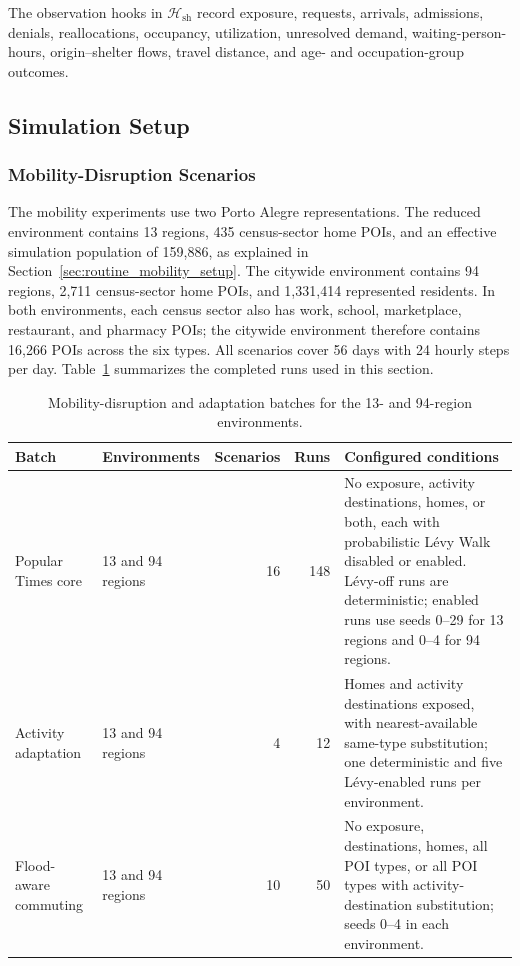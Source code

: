 The observation hooks in $\mathcal{H}_{\mathrm{sh}}$ record exposure, requests, arrivals, admissions, denials, reallocations, occupancy, utilization, unresolved demand, waiting-person-hours, origin--shelter flows, travel distance, and age- and occupation-group outcomes.

\subsection{Simulation Setup}
\label{sec:environment_disruption_setup}

\subsubsection{Mobility-Disruption Scenarios}

The mobility experiments use two Porto Alegre representations. The reduced environment contains 13 regions, 435 census-sector home POIs, and an effective simulation population of 159,886, as explained in Section~\ref{sec:routine_mobility_setup}. The citywide environment contains 94 regions, 2,711 census-sector home POIs, and 1,331,414 represented residents. In both environments, each census sector also has work, school, marketplace, restaurant, and pharmacy POIs; the citywide environment therefore contains 16,266 POIs across the six types. All scenarios cover 56 days with 24 hourly steps per day. Table~\ref{tbl:mobility_disruption_batches} summarizes the completed runs used in this section.

\begin{table}[ht]
\centering
\footnotesize
\caption{Mobility-disruption and adaptation batches for the 13- and 94-region environments.}
\label{tbl:mobility_disruption_batches}
\begin{tabularx}{\linewidth}{@{}llrrX@{}}
\toprule
\textbf{Batch} & \textbf{Environments} & \textbf{Scenarios} & \textbf{Runs} & \textbf{Configured conditions} \\
\midrule
Popular Times core
    & 13 and 94 regions & 16 & 148
    & No exposure, activity destinations, homes, or both, each with probabilistic L\'evy Walk disabled or enabled. L\'evy-off runs are deterministic; enabled runs use seeds 0--29 for 13 regions and 0--4 for 94 regions. \\
Activity adaptation
    & 13 and 94 regions & 4 & 12
    & Homes and activity destinations exposed, with nearest-available same-type substitution; one deterministic and five L\'evy-enabled runs per environment. \\
Flood-aware commuting
    & 13 and 94 regions & 10 & 50
    & No exposure, destinations, homes, all POI types, or all POI types with activity-destination substitution; seeds 0--4 in each environment. \\
\bottomrule
\end{tabularx}
\end{table}

